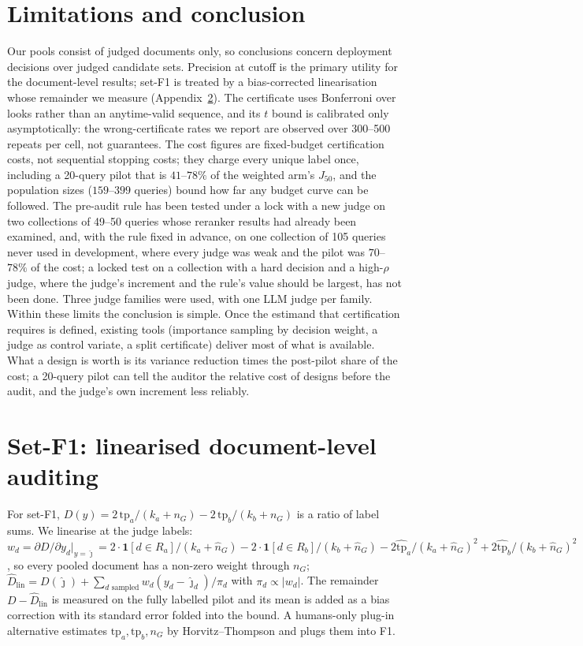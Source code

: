 \documentclass{article}
\newcommand{\Jfifty}{J_{50}}
\begin{document}
\section{Limitations and conclusion}
Our pools consist of judged documents only, so conclusions concern deployment decisions over judged candidate sets. Precision at cutoff is the primary utility for the document-level results; set-F1 is treated by a bias-corrected linearisation whose remainder we measure (Appendix~\ref{app:f1}). The certificate uses Bonferroni over looks rather than an anytime-valid sequence, and its $t$ bound is calibrated only asymptotically: the wrong-certificate rates we report are observed over 300--500 repeats per cell, not guarantees. The cost figures are fixed-budget certification costs, not sequential stopping costs; they charge every unique label once, including a 20-query pilot that is $41$--$78\%$ of the weighted arm's $\Jfifty$, and the population sizes ($159$--$399$ queries) bound how far any budget curve can be followed. The pre-audit rule has been tested under a lock with a new judge on two collections of 49--50 queries whose reranker results had already been examined, and, with the rule fixed in advance, on one collection of 105 queries never used in development, where every judge was weak and the pilot was $70$--$78\%$ of the cost; a locked test on a collection with a hard decision and a high-$\rho$ judge, where the judge's increment and the rule's value should be largest, has not been done. Three judge families were used, with one LLM judge per family. Within these limits the conclusion is simple. Once the estimand that certification requires is defined, existing tools (importance sampling by decision weight, a judge as control variate, a split certificate) deliver most of what is available. What a design is worth is its variance reduction times the post-pilot share of the cost; a 20-query pilot can tell the auditor the relative cost of designs before the audit, and the judge's own increment less reliably.




\appendix
\section{Set-F1: linearised document-level auditing}\label{app:f1}
For set-F1, $D(y)=2\,\mathrm{tp}_a/(k_a+n_G)-2\,\mathrm{tp}_b/(k_b+n_G)$ is a ratio of label sums. We linearise at the judge labels: $w_d=\partial D/\partial y_d|_{y=\hat\jmath}=2\cdot\mathbf 1[d\in R_a]/(k_a+\hat n_G)-2\cdot\mathbf 1[d\in R_b]/(k_b+\hat n_G)-2\hat{\mathrm{tp}}_a/(k_a+\hat n_G)^2+2\hat{\mathrm{tp}}_b/(k_b+\hat n_G)^2$, so every pooled document has a non-zero weight through $n_G$; $\hat D_{\mathrm{lin}}=D(\hat\jmath)+\sum_{d\text{ sampled}}w_d(y_d-\hat\jmath_d)/\pi_d$ with $\pi_d\propto|w_d|$. The remainder $D-\hat D_{\mathrm{lin}}$ is measured on the fully labelled pilot and its mean is added as a bias correction with its standard error folded into the bound. A humans-only plug-in alternative estimates $\mathrm{tp}_a,\mathrm{tp}_b,n_G$ by Horvitz--Thompson and plugs them into F1.
\end{document}

